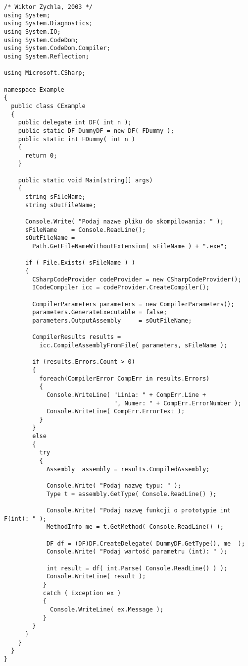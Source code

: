 \begin{scriptsize}
\begin{verbatim}
/* Wiktor Zychla, 2003 */
using System;
using System.Diagnostics;
using System.IO;
using System.CodeDom;
using System.CodeDom.Compiler;
using System.Reflection;

using Microsoft.CSharp;

namespace Example
{
  public class CExample 
  {
    public delegate int DF( int n );
    public static DF DummyDF = new DF( FDummy );
    public static int FDummy( int n )
    {
      return 0;
    }

    public static void Main(string[] args)
    {
      string sFileName;
      string sOutFileName;

      Console.Write( "Podaj nazwe pliku do skompilowania: " );
      sFileName    = Console.ReadLine();
      sOutFileName = 
        Path.GetFileNameWithoutExtension( sFileName ) + ".exe";

      if ( File.Exists( sFileName ) )
      {
        CSharpCodeProvider codeProvider = new CSharpCodeProvider();
        ICodeCompiler icc = codeProvider.CreateCompiler();

        CompilerParameters parameters = new CompilerParameters();
        parameters.GenerateExecutable = false;
        parameters.OutputAssembly     = sOutFileName;
     
        CompilerResults results = 
          icc.CompileAssemblyFromFile( parameters, sFileName );
      
        if (results.Errors.Count > 0)
        {
          foreach(CompilerError CompErr in results.Errors)
          {
            Console.WriteLine( "Linia: " + CompErr.Line + 
                               ", Numer: " + CompErr.ErrorNumber );
            Console.WriteLine( CompErr.ErrorText );
          }
        }
        else
        {
          try
          {
            Assembly  assembly = results.CompiledAssembly;

            Console.Write( "Podaj nazwę typu: " );
            Type t = assembly.GetType( Console.ReadLine() );
          
            Console.Write( "Podaj nazwę funkcji o prototypie int F(int): " );
            MethodInfo me = t.GetMethod( Console.ReadLine() );

            DF df = (DF)DF.CreateDelegate( DummyDF.GetType(), me  );
            Console.Write( "Podaj wartość parametru (int): " );

            int result = df( int.Parse( Console.ReadLine() ) ); 
            Console.WriteLine( result ); 
           }
           catch ( Exception ex )
           {
             Console.WriteLine( ex.Message );
           } 
        }
      }
    }
  }
}


\end{verbatim}
\end{scriptsize}
